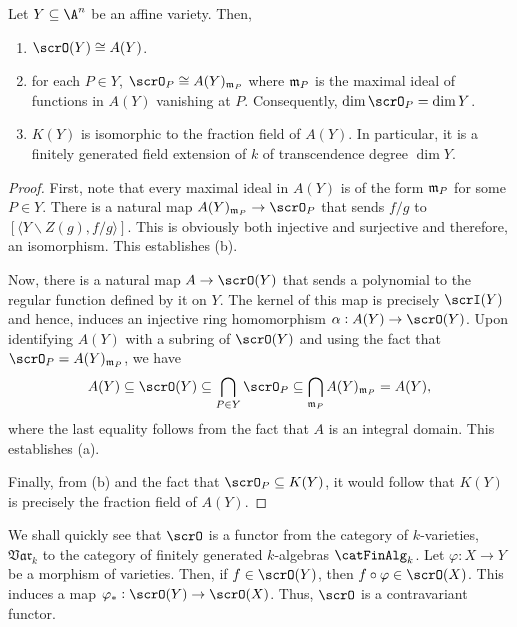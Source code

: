 \begin{theorem}
    Let $Y\subseteq\A^n$ be an affine variety. Then, 
    \begin{enumerate}[label=(\alph*)]
        \item $\scrO(Y)\cong A(Y)$.
        \item for each $P\in Y$, $\scrO_P\cong A(Y)_{\frakm_P}$ where $\mathfrak m_P$ is the maximal ideal of functions in $A(Y)$ vanishing at $P$. Consequently, $\dim\scrO_P = \dim Y$.
        \item $K(Y)$ is isomorphic to the fraction field of $A(Y)$. In particular, it is a finitely generated field extension of $k$ of transcendence degree $\dim Y$.
    \end{enumerate}
\end{theorem}
\begin{proof}
    First, note that every maximal ideal in $A(Y)$ is of the form $\mathfrak m_P$ for some $P\in Y$. There is a natural map $A(Y)_{\frakm_P}\to\scrO_P$ that sends $f/g$ to $[\langle Y\backslash Z(g), f/g\rangle]$. This is obviously both injective and surjective and therefore, an isomorphism. This establishes (b). 

    Now, there is a natural map $A\to\scrO(Y)$ that sends a polynomial to the regular function defined by it on $Y$. The kernel of this map is precisely $\scrI(Y)$ and hence, induces an injective ring homomorphism $\alpha: A(Y)\to\scrO(Y)$. Upon identifying $A(Y)$ with a subring of $\scrO(Y)$ and using the fact that $\scrO_P = A(Y)_{\frakm_P}$, we have 
    \begin{equation*}
        A(Y)\subseteq\scrO(Y)\subseteq\bigcap_{P\in Y}\scrO_P\subseteq\bigcap_{\frakm_P}A(Y)_{\frakm_P} = A(Y),
    \end{equation*}
    where the last equality follows from the fact that $A$ is an integral domain. This establishes (a).

    Finally, from (b) and the fact that $\scrO_P\subseteq K(Y)$, it would follow that $K(Y)$ is precisely the fraction field of $A(Y)$.
\end{proof}

\begin{remark}
    We shall quickly see that $\scrO$ is a functor from the category of $k$-varieties, $\mathfrak{Var}_k$ to the category of finitely generated $k$-algebras $\catFinAlg_k$. Let $\varphi: X\to Y$ be a morphism of varieties. Then, if $f\in\scrO(Y)$, then $f\circ\varphi\in\scrO(X)$. This induces a map $\varphi_\ast:\scrO(Y)\to\scrO(X)$. Thus, $\scrO$ is a contravariant functor.
\end{remark}

